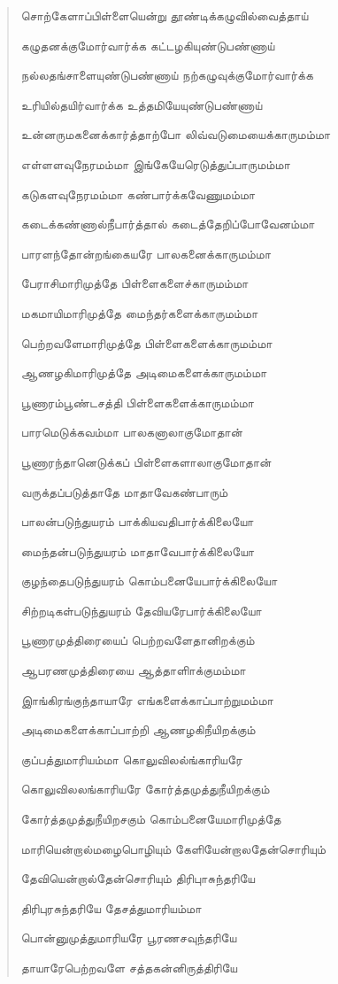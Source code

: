 \documentclass{article}
\begin{document}
\begin{quotation}
{சொற்கேளாப்பிள்ளையென்று தூண்டிக்கழுவில்வைத்தாய்

கழுதனக்குமோர்வார்க்க கட்டழகியுண்டுபண்ணாய்

நல்லதங்சாளையுண்டுபண்ணாய் நற்கழுவுக்குமோர்வார்க்க

உரியில்தயிர்வார்க்க உத்தமியேயுண்டுபண்ணாய்

உன்னருமகனைக்கார்த்தாற்போ லிவ்வடுமையைக்காருமம்மா

எள்ளளவுநேரமம்மா இங்கேயேரெடுத்துப்பாருமம்மா

கடுகளவுநேரமம்மா கண்பார்க்கவேணுமம்மா

கடைக்கண்ணால்நீபார்த்தால் கடைத்தேறிப்போவேனம்மா

பாரளந்தோன்றங்கையரே பாலகனைக்காருமம்மா

பேராசிமாரிமுத்தே பிள்ளைகளைச்காருமம்மா

மகமாயிமாரிமுத்தே மைந்தர்களைக்காருமம்மா

பெற்றவளேமாரிமுத்தே பிள்ளைகளைக்காருமம்மா

ஆணழகிமாரிமுத்தே அடிமைகளைக்காருமம்மா

பூணாரம்பூண்டசத்தி பிள்ளைகளைக்காருமம்மா

பாரமெடுக்கவம்மா பாலகனாலாகுமோதான்

பூணாரந்தானெடுக்கப் பிள்ளைகளாலாகுமோதான்

வருக்தப்படுத்தாதே மாதாவேகண்பாரும்

பாலன்படுந்துயரம் பாக்கியவதிபார்க்கிலையோ

மைந்தன்படுந்துயரம் மாதாவேபார்க்கிலையோ

குழந்தைபடுந்துயரம் கொம்பனையேபார்க்கிலையோ

சிற்றடிகள்படுந்துயரம் தேவியரேபார்க்கிலையோ

பூணாரமுத்திரையைப் பெற்றவளேதானிறக்கும்

ஆபரணமுத்திரையை ஆத்தாளிாக்குமம்மா

இாங்கிரங்குந்தாயாரே எங்களைக்காப்பாற்றுமம்மா

அடிமைகளைக்காப்பாற்றி ஆணழகிநீயிறக்கும்

குப்பத்துமாரியம்மா கொலுவிலல்ங்காரியரே

கொலுவிலலங்காரியரே கோர்த்தமுத்துநீயிறக்கும்

கோர்த்தமுத்துநீயிறசகும் கொம்பனையேமாரிமுத்தே

மாரியென்றால்மழைபொழியும் கேளியேன்றாலதேன்சொரியும்

தேவியென்றால்தேன்சொரியும் திரிபுாசுந்தரியே

திரிபுரசுந்தரியே தேசத்துமாரியம்மா

பொன்னுமுத்துமாரியரே பூரணசவுந்தரியே

தாயாரேபெற்றவளே சத்தகன்னிருத்திரியே

}
\end{quotation}
\end{document}
